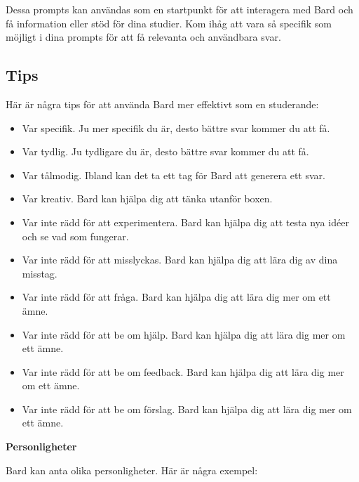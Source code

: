 Dessa prompts kan användas som en startpunkt för att interagera med Bard
och få information eller stöd för dina studier. Kom ihåg att vara så
specifik som möjligt i dina prompts för att få relevanta och användbara
svar.

\hypertarget{tips}{%
\subsection{Tips}\label{tips}}

Här är några tips för att använda Bard mer effektivt som en studerande:

\begin{itemize}
\tightlist
\item
  Var specifik. Ju mer specifik du är, desto bättre svar kommer du att
  få.
\item
  Var tydlig. Ju tydligare du är, desto bättre svar kommer du att få.
\item
  Var tålmodig. Ibland kan det ta ett tag för Bard att generera ett
  svar.
\item
  Var kreativ. Bard kan hjälpa dig att tänka utanför boxen.
\item
  Var inte rädd för att experimentera. Bard kan hjälpa dig att testa nya
  idéer och se vad som fungerar.
\item
  Var inte rädd för att misslyckas. Bard kan hjälpa dig att lära dig av
  dina misstag.
\item
  Var inte rädd för att fråga. Bard kan hjälpa dig att lära dig mer om
  ett ämne.
\item
  Var inte rädd för att be om hjälp. Bard kan hjälpa dig att lära dig
  mer om ett ämne.
\item
  Var inte rädd för att be om feedback. Bard kan hjälpa dig att lära dig
  mer om ett ämne.
\item
  Var inte rädd för att be om förslag. Bard kan hjälpa dig att lära dig
  mer om ett ämne.
\end{itemize}

\textbf{Personligheter}

Bard kan anta olika personligheter. Här är några exempel:

